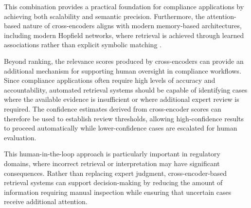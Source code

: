 This combination provides a practical foundation for compliance applications by achieving both scalability and semantic precision. Furthermore, the attention-based nature of cross-encoders aligns with modern memory-based architectures, including modern Hopfield networks, where retrieval is achieved through learned associations rather than explicit symbolic matching \cite{ramsauer2021hopfield}.

Beyond ranking, the relevance scores produced by cross-encoders can provide an additional mechanism for supporting human oversight in compliance workflows. Since compliance applications often require high levels of accuracy and accountability, automated retrieval systems should be capable of identifying cases where the available evidence is insufficient or where additional expert review is required. The confidence estimates derived from cross-encoder scores can therefore be used to establish review thresholds, allowing high-confidence results to proceed automatically while lower-confidence cases are escalated for human evaluation.

This human-in-the-loop approach is particularly important in regulatory domains, where incorrect retrieval or interpretation may have significant consequences. Rather than replacing expert judgment, cross-encoder-based retrieval systems can support decision-making by reducing the amount of information requiring manual inspection while ensuring that uncertain cases receive additional attention.